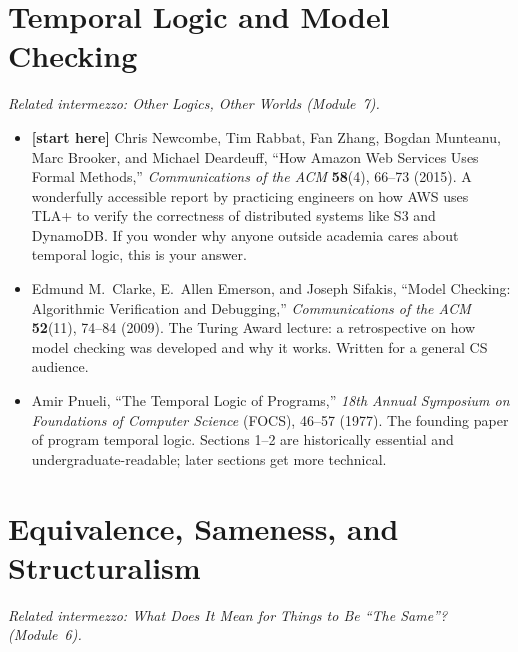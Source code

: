 \documentclass[11pt]{article}
\begin{document}
\section*{Temporal Logic and Model Checking}
\emph{Related intermezzo: Other Logics, Other Worlds (Module~7).}

\begin{itemize}
  \item \textbf{[start here]} Chris Newcombe, Tim Rabbat, Fan Zhang, Bogdan Munteanu, Marc Brooker, and Michael Deardeuff, ``How Amazon Web Services Uses Formal Methods,'' \emph{Communications of the ACM} \textbf{58}(4), 66--73 (2015). A wonderfully accessible report by practicing engineers on how AWS uses TLA+ to verify the correctness of distributed systems like S3 and DynamoDB. If you wonder why anyone outside academia cares about temporal logic, this is your answer.
  \item Edmund M.\ Clarke, E.\ Allen Emerson, and Joseph Sifakis, ``Model Checking: Algorithmic Verification and Debugging,'' \emph{Communications of the ACM} \textbf{52}(11), 74--84 (2009). The Turing Award lecture: a retrospective on how model checking was developed and why it works. Written for a general CS audience.
  \item Amir Pnueli, ``The Temporal Logic of Programs,'' \emph{18th Annual Symposium on Foundations of Computer Science} (FOCS), 46--57 (1977). The founding paper of program temporal logic. Sections 1--2 are historically essential and undergraduate-readable; later sections get more technical.
\end{itemize}

\section*{Equivalence, Sameness, and Structuralism}
\emph{Related intermezzo: What Does It Mean for Things to Be ``The Same''? (Module~6).}
\end{document}
